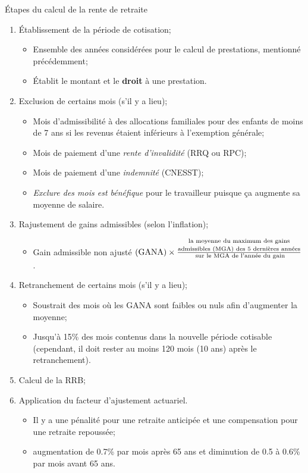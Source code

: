 \documentclass[10pt, french]{article}
\begin{document}
\begin{multicols*}{3}
\begin{algo}{Étapes du calcul de la rente de retraite}
\begin{enumerate}[leftmargin = *]
	\item	Établissement de la période de cotisation;
		\begin{itemize}[leftmargin = *]
		\item	Ensemble des années considérées pour le calcul de prestations, mentionné précédemment;				
		\item	Établit le montant et le \textbf{droit} à une prestation.
		\end{itemize}
	\item	Exclusion de certains mois (s'il y a lieu);
		\begin{itemize}[leftmargin = *]
		\item	Mois d'admissibilité à des allocations familiales pour des enfants de moins de 7 ans si les revenus étaient inférieurs à l'exemption générale;
		\item	Mois de paiement d'une \textit{rente d'invalidité }(RRQ ou RPC);
		\item	Mois de paiement d'une \textit{indemnité} (CNESST);
		\item	\textit{Exclure des mois est bénéfique} pour le travailleur puisque ça augmente sa moyenne de salaire.
		\end{itemize}
	\item	Rajustement de gains admissibles (selon l'inflation);
		\begin{itemize}[leftmargin = *]
		\item	Gain admissible non ajusté 
		$\text{(GANA)} \times \frac{\text{\shortstack{la moyenne du maximum des gains\\ admissibles (MGA) des 5 dernières années}}}{\text{ sur le MGA de l'année du gain}}$.
		\end{itemize}
	\item	Retranchement de certains mois (s'il y a lieu);
		\begin{itemize}[leftmargin = *]
		\item	Soustrait des mois où les GANA sont faibles ou nuls afin d'augmenter la moyenne;
		\item	Jusqu'à 15\% des mois contenus dans la nouvelle période cotisable (cependant, il doit rester au moins 120 mois (10 ans) après le retranchement).
		\end{itemize}
	\item	Calcul de la RRB;
	\item	Application du facteur d'ajustement actuariel.
		\begin{itemize}[leftmargin = *]
		\item	Il y a une pénalité pour une retraite anticipée et une compensation pour une retraite repoussée;
		\item	augmentation de 0.7\% par mois après 65 ans et diminution de 0.5 à 0.6\% par mois  avant 65 ans.
		\end{itemize}
\end{enumerate}
\end{algo}


\end{multicols*}
\end{document}
